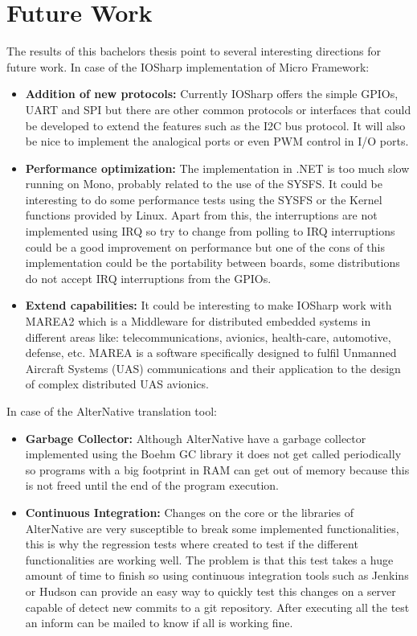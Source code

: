 \section{Future Work}\label{S:Future-Work}
The results of this bachelors thesis point to several interesting directions for future work.
In case of the IOSharp implementation of Micro Framework:
\begin{itemize}
\item \textbf{Addition of new protocols:} Currently IOSharp offers the simple GPIOs, UART and SPI but there are other common protocols or interfaces that could be developed to extend the features such as the \gls{I2C} bus protocol. It will also be nice to implement the analogical ports or even \gls{PWM} control in I/O ports.

\item \textbf{Performance optimization:} The implementation in .NET is too much slow running on Mono, probably related to the use of the \gls{SYSFS}. It could be interesting to do some performance tests using the \gls{SYSFS} or the Kernel functions provided by Linux. Apart from this, the interruptions are not implemented using \gls{IRQ} so try to change from polling to \gls{IRQ} interruptions could be a good improvement on performance but one of the cons of this implementation could be the portability between boards, some distributions do not accept IRQ interruptions from the GPIOs.

\item \textbf{Extend capabilities:} It could be interesting to make IOSharp work with MAREA2 which is a Middleware for distributed embedded systems in different areas like: telecommunications, avionics, health-care, automotive, defense, etc. MAREA is a software specifically designed to fulfil Unmanned Aircraft Systems (UAS) communications and their application to the
design of complex distributed UAS avionics.

\end{itemize}

In case of the AlterNative translation tool:
\begin{itemize}
\item \textbf{Garbage Collector:} Although AlterNative have a garbage collector implemented using the Boehm GC library it does not get called periodically so programs with a big footprint in RAM can get out of memory because this is not freed until the end of the program execution.

\item \textbf{Continuous Integration:} Changes on the core or the libraries of AlterNative are very susceptible to break some implemented functionalities, this is why the regression tests where created to test if the different functionalities are working well. The problem is that this test takes a huge amount of time to finish so using continuous integration tools such as Jenkins or Hudson can provide an easy way to quickly test this changes on a server capable of detect new commits to a git repository. After executing all the test an inform can be mailed to know if all is working fine.
\end{itemize}
